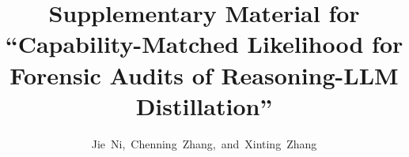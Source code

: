 \documentclass[onecolumn,journal]{IEEEtran}
\begin{document}
\title{Supplementary Material for ``Capability-Matched Likelihood for Forensic Audits of Reasoning-LLM Distillation''}

\author{Jie~Ni,~Chenning~Zhang,~and~Xinting~Zhang}

\maketitle


\end{document}
